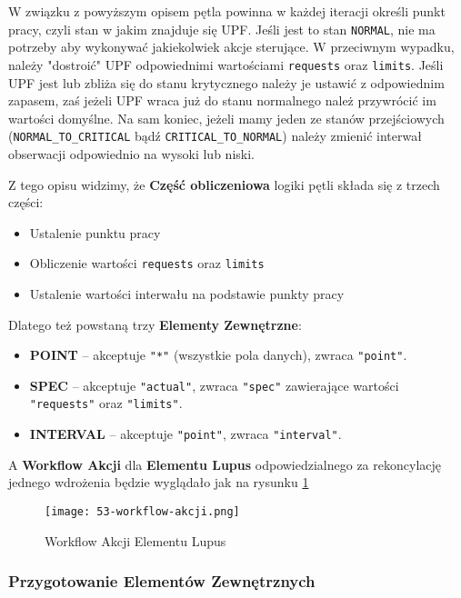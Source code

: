 W związku z powyższym opisem pętla powinna w każdej iteracji określi punkt pracy, czyli stan w jakim znajduje się UPF. Jeśli jest to stan \texttt{NORMAL}, nie ma potrzeby aby wykonywać jakiekolwiek akcje sterujące. W przeciwnym wypadku, należy "dostroić" UPF odpowiednimi wartościami \texttt{requests} oraz \texttt{limits}. Jeśli UPF jest lub zbliża się do stanu krytycznego należy je ustawić z odpowiednim zapasem, zaś jeżeli UPF wraca już do stanu normalnego należ przywrócić im wartości domyślne. Na sam koniec, jeżeli mamy jeden ze stanów przejściowych (\texttt{NORMAL\_TO\_CRITICAL} bądź \texttt{CRITICAL\_TO\_NORMAL}) należy zmienić interwał obserwacji odpowiednio na wysoki lub niski.

Z tego opisu widzimy, że \textbf{Część obliczeniowa} logiki pętli składa się z trzech części:
\begin{itemize}
    \item Ustalenie punktu pracy 
    \item Obliczenie wartości \texttt{requests} oraz \texttt{limits}
    \item Ustalenie wartości interwału na podstawie punkty pracy
\end{itemize}

Dlatego też powstaną trzy \textbf{Elementy Zewnętrzne}:
\begin{itemize}
    \item \textbf{POINT} – akceptuje \texttt{"*"} (wszystkie pola danych), zwraca \texttt{"point"}.
    \item \textbf{SPEC} – akceptuje \texttt{"actual"}, zwraca \texttt{"spec"} zawierające wartości \texttt{"requests"} oraz \texttt{"limits"}.
    \item \textbf{INTERVAL} – akceptuje \texttt{"point"}, zwraca \texttt{"interval"}.
\end{itemize}

A \textbf{Workflow Akcji} dla \textbf{Elementu Lupus} odpowiedzialnego za rekoncylację jednego wdrożenia będzie wyglądało jak na rysunku \ref{fig:53-workflow-akcji}

\begin{figure}[!h]
    \centering \texttt{[image: 53-workflow-akcji.png]}
    \caption{Workflow Akcji Elementu Lupus}\label{fig:53-workflow-akcji}
\end{figure}

\subsubsection{Przygotowanie Elementów Zewnętrznych}

